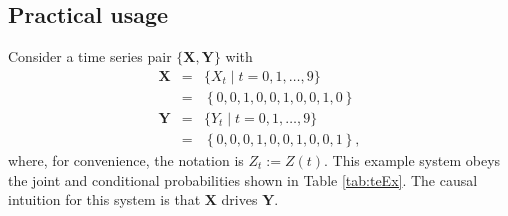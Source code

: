 \subsection{Practical usage}
\label{sec:tePUSE}
Consider a time series pair $\{\mathbf{X},\mathbf{Y}\}$ with
\begin{eqnarray*}
\mathbf{X} &=& \{X_t\; | \; t=0,1,\ldots,9\}\\
&=& \left\{0,0,1,0,0,1,0,0,1,0\right\}\\
\mathbf{Y} &=& \{Y_t\; | \; t=0,1,\ldots,9\}\\
&=& \left\{0,0,0,1,0,0,1,0,0,1\right\},
\end{eqnarray*}
where, for convenience, the notation is $Z_t := Z(t)$. This example system obeys the joint and conditional probabilities shown in Table \ref{tab:teEx}.  The causal intuition for this system is that $\mathbf{X}$ drives $\mathbf{Y}$.  

